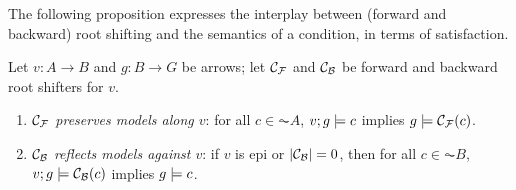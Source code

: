 The following proposition expresses the interplay between (forward and backward) root shifting and the semantics of a condition, in terms of satisfaction.

\begin{proposition}
Let $v:A\to B$ and $g:B\to G$ be arrows; let $\mathcal{C}_{\mathcal{F}}$ and $\mathcal{C}_{\mathcal{B}}$ be forward and backward root shifters for $v$.
\begin{enumerate}
\item \emph{$\mathcal{C}_{\mathcal{F}}$ preserves models along $v$}: for all $c\in\AC A$, $v;g\models c$ implies $g\models \mathcal{C}_{\mathcal{F}}(c)$.
\item \emph{$\mathcal{C}_{\mathcal{B}}$ reflects models against $v$}: if $v$ is epi or $|\mathcal{C}_{\mathcal{B}}|=0$, then for all $c\in\AC B$, $v;g\models \mathcal{C}_{\mathcal{B}}(c)$ implies $g\models c$.
\end{enumerate}
\end{proposition}
%

